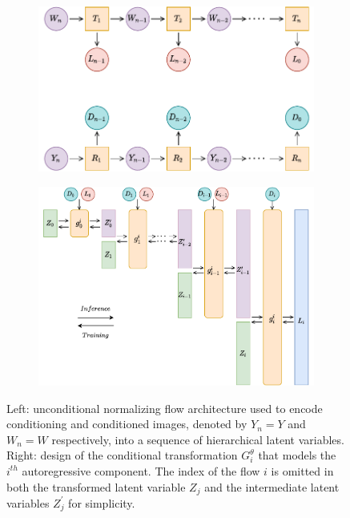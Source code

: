 \begin{figure}[h]
    \centering
    \begin{subfigure}{0.45\textwidth}
        \includegraphics[width=\textwidth]{Outline/figures/caflow/dual_glow.pdf}
    \end{subfigure}%
    \qquad 
    \begin{subfigure}{0.47\textwidth}
            \includegraphics[width=\textwidth]{Outline/figures/caflow/high_level_design_conditional_modified.pdf}
    \end{subfigure}
    \caption{Left: unconditional normalizing flow architecture used to encode conditioning and conditioned images, denoted by $Y_n = Y$ and $W_n = W$ respectively, into a sequence of hierarchical latent variables. Right: design of the conditional transformation $G_{i}^\theta$ that models the $i^{th}$ autoregressive component. The index of the flow $i$ is omitted in both the transformed latent variable $Z_j$ and the intermediate latent variables $Z_j^{\prime}$ for simplicity.}
           \label{fig:high_level_design_conditional}
    \end{figure}

